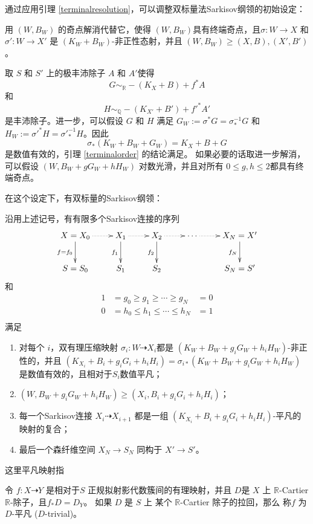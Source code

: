 通过应用引理 \ref{terminalresolution}，可以调整双标量法Sarkisov纲领的初始设定：
\begin{assertion}\label{doublesetting}
用 $(W,B_W)$ 的奇点解消代替它，使得 $(W,B_{W})$具有终端奇点，且$\sigma:W\to X$ 和$\sigma':W\to X'$ 是 $(K_W+B_W)$-非正性态射，并且 $(W,B_W)\geqslant (X,B),(X',B')$。

  取 $ S $ 和 $ S' $ 上的极丰沛除子 $ A $ 和 $ A' $使得 
  \[ G\sim_{\mathbb{R}}-(K_X+B)+f^*A \]
  和
  \[ H\sim_{\mathbb{Q}}-(K_{X'}+B')+f'^{*}A'  \]
  是丰沛除子。进一步，可以假设 $ G $ 和 $ H $ 满足 $G_{W}:= \sigma^*G=\sigma^{-1}_*G $ 和 $ H_{W}:=\sigma'^{*}H=\sigma'^{-1}_*H $。因此 
  \[ \sigma_{*}(K_{W}+B_{W}+G_{W})=K_{X}+B+G \]
  是数值有效的，引理 \ref{terminalorder} 的结论满足。 如果必要的话取进一步解消，可以假设
 $(W, B_W+gG_W+hH_W)$ 对数光滑，并且对所有 $0\leqslant g,h\leqslant 2$都具有终端奇点。
\end{assertion}
 在这个设定下，有双标量的Sarkisov纲领：
\begin{theorem}[双标量Sarkisov纲领]\label{main2}
  \cite[Claim 13.12]{haconMinimalModelProgram2012}
  沿用上述记号，有有限多个Sarkisov连接的序列
  \[ \xymatrix{
    X=X_0\ar@{.>}[r]\ar[d]_{f=f_{0}}&X_{1}\ar@{.>}[r]\ar[d]_{f_{1}}& X_{2}\ar[d]_{f_{2}}\ar@{.>}[r] &\cdots\ar@{.>}[r]&X_N=X'\ar[d]_{f_{N}} \\
    S=S_{0}&S_{1} &S_{2}&&S_N=S'
    } \]
  和
  \[ \begin{aligned}
      1 & =g_0\geqslant g_1 \geqslant \cdots \geqslant g_N   & =0 \\
      0 & =h_0\leqslant h_{1} \leqslant \cdots \leqslant h_N & =1 \\
    \end{aligned} \]
  满足
  \begin{enumerate}
    \item 对每个 $i$，双有理压缩映射 $\sigma_i:W\dashrightarrow  X_{i}$都是 $(K_{W}+B_{W}+g_{i}G_{W}+h_{i}H_{W})$-非正性的，并且 $(K_{X_{i}}+B_{i}+g_{i}G_{i}+h_{i}H_{i})=\sigma_{i*}(K_{W}+B_{W}+g_{i}G_{W}+h_{i}H_{W})$ 是数值有效的，且相对于$S_{i}$数值平凡；
    \item $(W,B_{W}+g_{i}G_{W}+h_{i}H_{W})\geqslant (X_{i},B_{i}+g_{i}G_{i}+h_{i}H_{i})$；
    \item 每一个Sarkisov连接 $X_{i}\dashrightarrow X_{i+1}$ 都是一组 $(K_{X_{i}}+B_{i}+g_{i}G_{i}+h_{i}H_{i})$-平凡的映射的复合；
    \item 最后一个森纤维空间 $X_{N} \to S_{N}$ 同构于 $X'\to S'$。
  \end{enumerate}
\end{theorem}
这里平凡映射指
\begin{definition}\label{trivialmap}
  \cite[\S 13.2]{haconMinimalModelProgram2012} 令 $f:X\dashrightarrow Y$ 是相对于$S$ 正规拟射影代数簇间的有理映射，并且 $D$是 $X$  上  $\mathbb{R}$-Cartier $\mathbb{R}$-除子，且$f_*D=D_Y$。   如果 $D$ 是 $S$ 上 某个  $\mathbb{R}$-Cartier 除子的拉回，那么 称$f$ 为 $D$-平凡 ($D$-trivial)。
\end{definition}

